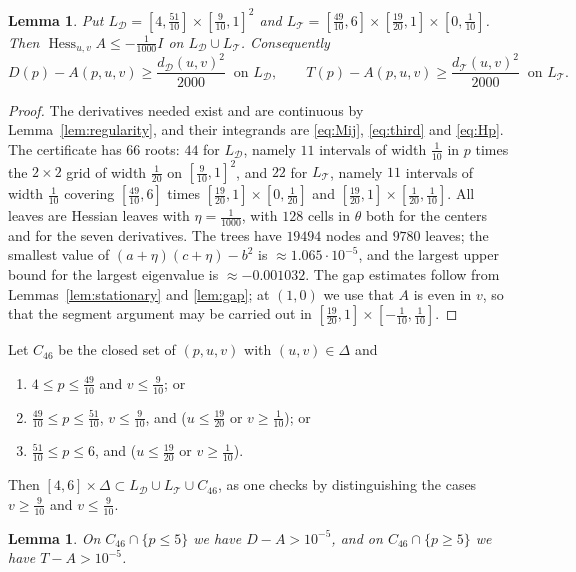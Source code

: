 \documentclass[11pt]{amsart}
\newtheorem{lemma}[theorem]{Lemma}
\theoremstyle{definition}
\theoremstyle{remark}
\numberwithin{equation}{section}
\newcommand{\Hess}{\operatorname{Hess}}
\newcommand{\cD}{\mathcal{D}}
\newcommand{\cT}{\mathcal{T}}
\begin{document}
\begin{lemma}\label{lem:46local}
Put $L_\cD=[4,\frac{51}{10}]\times[\frac9{10},1]^2$ and $L_\cT=[\frac{49}{10},6]\times[\frac{19}{20},1]\times[0,\frac1{10}]$. Then $\Hess_{u,v}A\le-\frac1{1000}I$ on $L_\cD\cup L_\cT$. Consequently
\[
D(p)-A(p,u,v)\ge\frac{d_\cD(u,v)^2}{2000}\ \text{ on }L_\cD,\qquad T(p)-A(p,u,v)\ge\frac{d_\cT(u,v)^2}{2000}\ \text{ on }L_\cT .
\]
\end{lemma}

\begin{proof}
The derivatives needed exist and are continuous by Lemma~\ref{lem:regularity}, and their integrands are \eqref{eq:Mij}, \eqref{eq:third} and \eqref{eq:Hp}. The certificate has $66$ roots: $44$ for $L_\cD$, namely $11$ intervals of width $\frac1{10}$ in $p$ times the $2\times2$ grid of width $\frac1{20}$ on $[\frac9{10},1]^2$, and $22$ for $L_\cT$, namely $11$ intervals of width $\frac1{10}$ covering $[\frac{49}{10},6]$ times $[\frac{19}{20},1]\times[0,\frac1{20}]$ and $[\frac{19}{20},1]\times[\frac1{20},\frac1{10}]$. All leaves are Hessian leaves with $\eta=\frac1{1000}$, with $128$ cells in $\theta$ both for the centers and for the seven derivatives. The trees have $19494$ nodes and $9780$ leaves; the smallest value of $(a+\eta)(c+\eta)-b^2$ is $\approx1.065\cdot10^{-5}$, and the largest upper bound for the largest eigenvalue is $\approx-0.001032$. The gap estimates follow from Lemmas~\ref{lem:stationary} and \ref{lem:gap}; at $(1,0)$ we use that $A$ is even in $v$, so that the segment argument may be carried out in $[\frac{19}{20},1]\times[-\frac1{10},\frac1{10}]$.
\end{proof}

Let $C_{46}$ be the closed set of $(p,u,v)$ with $(u,v)\in\Delta$ and
\begin{enumerate}[label=(\arabic*)]
\item $4\le p\le\frac{49}{10}$ and $v\le\frac9{10}$; or
\item $\frac{49}{10}\le p\le\frac{51}{10}$, $v\le\frac9{10}$, and ($u\le\frac{19}{20}$ or $v\ge\frac1{10}$); or
\item $\frac{51}{10}\le p\le6$, and ($u\le\frac{19}{20}$ or $v\ge\frac1{10}$).
\end{enumerate}
Then $[4,6]\times\Delta\subset L_\cD\cup L_\cT\cup C_{46}$, as one checks by distinguishing the cases $v\ge\frac9{10}$ and $v\le\frac9{10}$.

\begin{lemma}\label{lem:46compl}
On $C_{46}\cap\{p\le5\}$ we have $D-A>10^{-5}$, and on $C_{46}\cap\{p\ge5\}$ we have $T-A>10^{-5}$.
\end{lemma}
\end{document}
